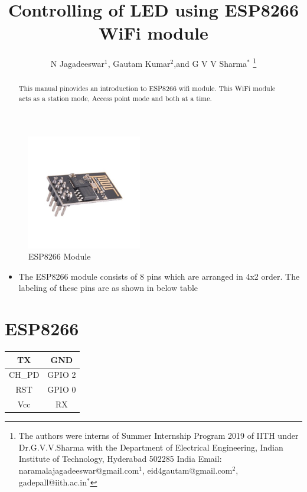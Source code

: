 \documentclass[journal,12pt,twocolumn]{IEEEtran}
\begin{document}

 
 

\title{Controlling of LED using ESP8266 WiFi module}


\author{N Jagadeeswar$^{1}$, Gautam Kumar$^{2}$,and G V V Sharma$^{*}$ %
\thanks{The authors were interns of Summer Internship Program 2019  of IITH under Dr.G.V.V.Sharma with the Department
of Electrical Engineering, Indian Institute of Technology, Hyderabad 502285 India  Email:  naramalajagadeeswar@gmail.com$^{1}$, eid4gautam@gmail.com$^{2}$, gadepall@iith.ac.in$^{*}$}}


\maketitle


\tableofcontents

\bigskip

\begin{abstract}
This manual pinovides an introduction to ESP8266 wifi module. This WiFi module acts as a station mode, Access point mode and both at  a time.
\end{abstract}
\begin{figure}[h!]
\centering
\includegraphics[height = 5cm, width = 5cm]{images/esp8266.jpeg}
\caption{ESP8266 Module}
\end{figure}
\begin{itemize}
\item The ESP8266 module consists of 8 pins which are arranged in 4x2 order. The labeling of these pins are as shown in below table
\end{itemize}
\section{ESP8266}
\begin{center}
\begin{tabular}{ |c|c| } 
\hline
TX    & GND       \\
\hline
CH_PD & GPIO 2    \\
\hline
RST   & GPIO 0    \\
\hline
Vcc   & RX        \\
\hline
\end{tabular}
\end{center}
\end{document}
